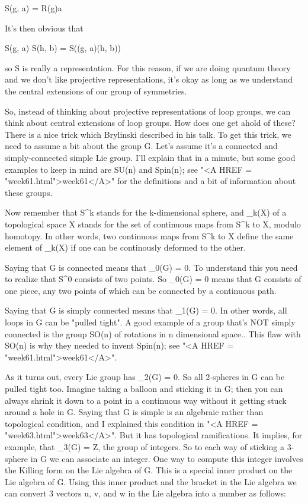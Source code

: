 S(g, a) = R(g)a

It's then obvious that

S(g, a) S(h, b) = S((g, a)(h, b))

so S is really a representation.  For this reason, if we are doing
quantum theory and we don't like projective representations, it's okay
as long as we understand the central extensions of our group of
symmetries.

So, instead of thinking about projective representations of loop groups,
we can think about central extensions of loop groups.  How does one get
ahold of these?  There is a nice trick which Brylinski described in his
talk.  To get this trick, we need to assume a bit about the group G.
Let's assume it's a connected and simply-connected simple Lie group.
I'll explain that in a minute, but some good examples to keep in mind
are SU(n) and Spin(n); see "<A HREF = "week61.html">week61</A>" for the definitions and a bit of
information about these groups.   

Now remember that S^k stands for the k-dimensional sphere, and \pi _k(X)
of a topological space X stands for the set of continuous maps from S^k
to X, modulo homotopy.  In other words, two continuous maps from S^k to
X define the same element of \pi _k(X) if one can be continously deformed
to the other.  

Saying that G is connected means that \pi _0(G) = 0.  To understand this
you need to realize that S^0 consists of two points.  So \pi _0(G) = 0
means that G consists of one piece, any two points of which can be
connected by a continuous path.

Saying that G is simply connected means that \pi _1(G) = 0.  In other
words, all loops in G can be "pulled tight".  A good example of a group
that's NOT simply connected is the group SO(n) of rotations in n
dimensional space..  This flaw with SO(n) is why they needed to invent
Spin(n); see "<A HREF = "week61.html">week61</A>".

As it turns out, every Lie group has \pi _2(G) = 0.  So all 2-spheres in G
can be pulled tight too.  Imagine taking a balloon and sticking it in G;
then you can always shrink it down to a point in a continuous way
without it getting stuck around a hole in G.  
Saying that G is simple is an algebraic rather than topological
condition, and I explained this condition in "<A HREF = "week63.html">week63</A>".  But it has
topological ramifications.  It implies, for example, that \pi _3(G) = Z,
the group of integers.  So to each way of sticking a 3-sphere in G we
can associate an integer.  One way to compute this integer involves the
Killing form 
on the Lie algebra of G.  This is a special inner product on the Lie
algebra of G.  Using this inner product and the bracket in the Lie
algebra we can convert 3 vectors u, v, and w in the Lie algebra into a
number as follows:

